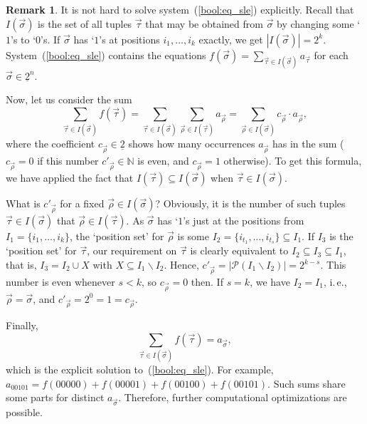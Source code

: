 \documentclass[12pt,notitlepage]{article}
\theoremstyle{plain}
\theoremstyle{definition}
\newtheorem{rem}[thm]{Remark}
\theoremstyle{plain}
\newcommand{\N}{\mathbb{N}}
\newcommand{\sbs}{\subseteq}
\renewcommand{\setminus}{\smallsetminus}
\newcommand{\mP}{\mathcal{P}}
\newcommand{\ul}[1]{\underline{#1}}
\newcommand{\1}{\mathbf{1}}
\newcommand{\0}{\mathbf{0}}
\begin{document}
\begin{rem}\label{bool:coeff}
It is not hard to solve system~(\ref{bool:eq_sle}) explicitly. Recall that $I(\vec \sigma)$ is the set of all tuples $\vec \tau$ that may be obtained from $\vec \sigma$ by changing some `$1$'s to `$0$'s. If $\vec \sigma$ has `$1$'s at positions $i_1, \ldots, i_k$ exactly, we get $|I(\vec\sigma)| = 2^k$. System~(\ref{bool:eq_sle}) contains the equations $f(\vec \sigma) = \sum_{\vec\tau \in I(\vec \sigma)} a_{\vec\tau}$ for each $\vec \sigma \in \ul{2}^n$.

Now, let us consider the sum
$$\sum_{\vec\tau \in I(\vec \sigma)} f(\vec\tau) = \sum_{\vec\tau \in I(\vec \sigma)} \sum_{\vec\rho \in I(\vec \tau)} a_{\vec\rho} = \sum_{\vec\rho \in I(\vec \sigma)} c_{\vec \rho} \cdot a_{\vec \rho},$$
where the coefficient $c_{\vec \rho} \in \ul{2}$ shows how many occurrences $a_{\vec \rho}$ has in the sum ($c_{\vec \rho} = 0$ if this number $c'_{\vec \rho} \in \N$ is even, and $c_{\vec \rho} = 1$ otherwise). To get this formula, we have applied the fact that $I(\vec \tau) \sbs I(\vec \sigma)$ when $\vec \tau \in I(\vec \sigma)$.

What is $c'_{\vec \rho}$ for a fixed $\vec \rho \in I(\vec \sigma)$? Obviously, it is the number of such tuples $\vec \tau \in I(\vec \sigma)$ that $\vec \rho \in I(\vec \tau)$. As $\vec \sigma$ has `$1$'s just at the positions from $I_1 = \{i_1, \ldots, i_k\}$, the `position set' for $\vec\rho$ is some $I_2 = \{ i_{t_1}, \ldots, i_{t_s} \} \sbs I_1$. If $I_3$ is the `position set' for $\vec \tau$, our requirement on $\vec \tau$ is clearly equivalent to $I_2 \sbs I_3 \sbs I_1$, that is, $I_3 = I_2 \cup X$ with $X \sbs I_1 \setminus I_2$. Hence, $c'_{\vec\rho} =  |\mP(I_1 \setminus I_2)| = 2^{k - s}$. This number is even whenever $s < k$, so $c_{\vec \rho} = 0$ then. If $s = k$, we have $I_2 = I_1$, i.\,e., $\vec \rho = \vec \sigma$, and $c'_{\vec \rho} = 2^0 = 1 = c_{\vec \rho}$.

Finally, $$\sum_{\vec\tau \in I(\vec \sigma)} f(\vec\tau) = a_{\vec \sigma},$$ which is the explicit solution to~(\ref{bool:eq_sle}). For example, $a_{00101} = f(00000) + f(00001) + f(00100) + f(00101)$. Such sums share some parts for distinct $a_{\vec \sigma}$. Therefore, further computational optimizations are possible.
\end{rem}
\end{document}
